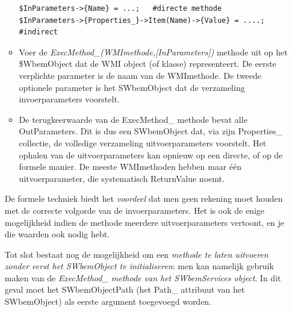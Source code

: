 \documentclass[11pt,a4paper]{report}
\begin{document}
\begin{itemize}
\begin{itemize}
		\begin{lstlisting}
$InParameters->{Name} = ...;   #directe methode
$InParameters->{Properties_}->Item(Name)->{Value} = ....;   #indirect
		\end{lstlisting}
		\item Voer de \textit{ExecMethod\_(WMImethode,[InParameters])} methode uit op het \$WbemObject dat de WMI object (of klasse) representeert. De eerste verplichte parameter is de naam van de WMImethode. De tweede optionele parameter is het SWbemObject dat de verzameling invoerparameters voorstelt.
		\item De terugkeerwaarde van de ExecMethod\_ methode bevat alle OutParameters. Dit is dus een SWbemObject dat, via zijn Properties\_ collectie, de volledige verzameling uitvoerparameters voorstelt. Het ophalen van de uitvoerparameters kan opnieuw op een directe, of op de formele manier. De meeste WMImethoden hebben maar één uitvoerparameter, die systematisch ReturnValue noemt.
	\end{itemize}
De formele techniek biedt het \textit{voordeel} dat men geen rekening moet houden met de correcte volgorde van de invoerparameters. Het is ook de enige mogelijkheid indien de methode meerdere uitvoerparameters vertoont, en je die waarden ook nodig hebt.
\par Tot slot bestaat nog de mogelijkheid om een \textit{methode te laten uitvoeren zonder eerst het SWbemObject te initialiseren}: men kan namelijk gebruik maken van de \textit{ExecMethod\_ methode van het SWbemServices object}. In dit geval moet het SWbemObjectPath (het Path\_ attribuut van het SWbemObject) als eerste argument toegevoegd worden.
\end{itemize}
\end{document}

